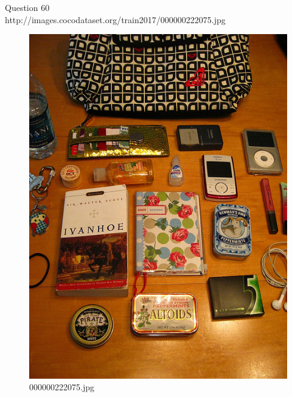 Question 60\\
http://images.cocodataset.org/train2017/000000222075.jpg
\begin{figure}[h]
    \centering
    \includegraphics[width=0.8\linewidth]{../image set/hard/000000222075.jpg}
    \caption{000000222075.jpg}
\end{figure}
